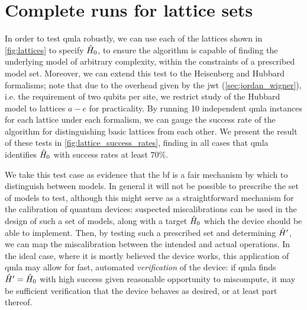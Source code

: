 \section{Complete  \glspl{run} for lattice sets}
In order to test \gls{qmla} robustly, 
    we can use each of the lattices shown in \cref{fig:lattices} to specify $\hat{H}_0$, 
    to ensure the algorithm is capable of finding the underlying model of arbitrary complexity, 
    within the constraints of a prescribed model set\footnotemark. 
Moreover, we can extend this test to the Heisenberg and Hubbard formalisms; 
    note that due to the overhead given by the \gls{jwt} (\cref{sec:jordan_wigner}), i.e. the requirement of two qubits per site, 
    we restrict study of the Hubbard model to lattices $a-e$ for practicality. 
By running 10 independent \gls{qmla} \glspl{instance} for each lattice under each formalism,
    we can gauge the success rate of the algorithm for distinguishing basic lattices from each other. 
We present the result of these tests in \cref{fig:lattice_success_rates},   
    finding in all cases that \gls{qmla} identifies $\hat{H}_0$ with success rates at least $70\%$. 
\par 

We take this test case as evidence that the \gls{bf} is a fair mechanism by which to distinguish between models. 
In general it will not be possible to prescribe the set of models to test, 
    although this might serve as a straightforward mechanism for the calibration of quantum devices:
    suspected miscalibrations can be used in the design of such a set of models, 
    along with a target $\hat{H}_0$ which the device should be able to implement. 
Then, by testing such a prescribed set and determining $\hat{H}^{\prime}$, 
    we can map the miscalibration between the intended and actual operations. 
In the ideal case, where it is mostly believed the device works, 
    this application of \gls{qmla} may allow for fast, automated \emph{verification} of the device:
    if \gls{qmla} finds $\hat{H}^{\prime}=\hat{H}_0$ with high success given reasonable opportunity to miscompute, 
    it may be sufficient verification that the device behaves as desired, 
    or at least part thereof. 


